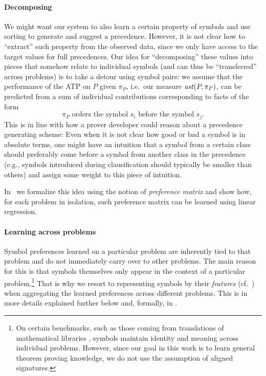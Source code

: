 \paragraph{Decomposing}

We might want our system to also learn a certain property of symbols and use sorting to generate and suggest a precedence. 
However, it is not clear how to ``extract'' such property from the observed data, since we only have 
access to the target values for full precedences. Our idea for ``decomposing'' these values into pieces 
that somehow relate to individual symbols (and can thus be ``transferred'' across problems) is to take a detour using symbol pairs:
we assume that the performance of the ATP on \(P\) given \(\pi_P\), i.e.~our measure $\operatorname{\mathit{ast}}(P,\pi_P)$, can be predicted 
from a sum of individual contributions corresponding to facts of the form 
\[\pi_P\text{ orders the symbol }s_i\text{ before the symbol }s_j.\]
This is in line with how a prover developer could reason about a precedence generating scheme:
Even when it is not clear how good or bad a symbol is in absolute terms,
one might have an intuition that a symbol from a certain class should preferably 
come before a symbol from another class in the precedence  
(e.g., symbols introduced during clausification should typically be smaller than others)
and assign some weight to this piece of intuition. 

In~ we formalize this idea using the notion of \emph{preference matrix}
and show how, for each problem in isolation, such preference matrix can be learned using linear regression.

\paragraph{Learning across problems}
Symbol preferences learned on a particular problem are inherently tied to that problem
and do not immediately carry over to other problems. The main reason for this 
is that symbols themselves only appear in the context of a particular problem.\footnote{
On certain benchmarks, such as those coming from translations of mathematical libraries \cite{KaliszykU13b},
symbols maintain identity and meaning across individual problems. However, since our goal in this work
is to learn general theorem proving knowledge, we do not use the assumption of aligned signatures.}
That is why we resort to representing symbols by their \emph{features} (cf.~)
when aggregating the learned preferences across different problems.
This is in more details explained further below and, formally, in .

